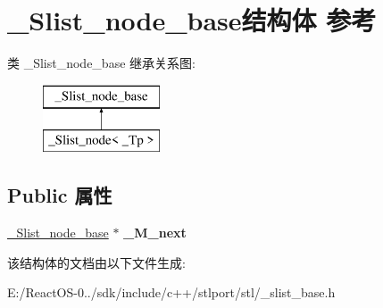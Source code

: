 \hypertarget{struct___slist__node__base}{}\section{\+\_\+\+Slist\+\_\+node\+\_\+base结构体 参考}
\label{struct___slist__node__base}
类 \+\_\+\+Slist\+\_\+node\+\_\+base 继承关系图\+:\begin{figure}[H]
\begin{center}
\leavevmode
\includegraphics[height=2.000000cm]{struct___slist__node__base}
\end{center}
\end{figure}
\subsection*{Public 属性}
\begin{DoxyCompactItemize}
\item 
\mbox{\label{struct___slist__node__base_a2c4decbcaed35ec0d73d2fcb61142d1d}} 
\hyperlink{struct___slist__node__base}{\+\_\+\+Slist\+\_\+node\+\_\+base} $\ast$ {\bfseries \+\_\+\+M\+\_\+next}
\end{DoxyCompactItemize}


该结构体的文档由以下文件生成\+:\begin{DoxyCompactItemize}
\item 
E\+:/\+React\+O\+S-\/0../sdk/include/c++/stlport/stl/\+\_\+slist\+\_\+base.\+h\end{DoxyCompactItemize}
